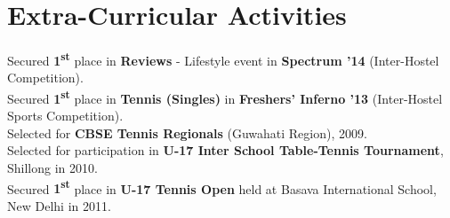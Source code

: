 \documentclass[a4paper]{norm-resume} %
\begin{document}
\vspace{2mm}	%


\section{Extra-Curricular Activities}

\vspace{2mm} %
	
	Secured \textbf{1\textsuperscript{st}} place in \textbf{Reviews} - Lifestyle event in \textbf{Spectrum '14} (Inter-Hostel Competition).\\
	Secured \textbf{1\textsuperscript{st}} place in \textbf{Tennis (Singles)} in \textbf{Freshers' Inferno '13} (Inter-Hostel Sports Competition).\\	
	Selected for \textbf{CBSE Tennis Regionals} (Guwahati Region), 2009.\\
	Selected for participation in \textbf{U-17 Inter School Table-Tennis Tournament}, Shillong in 2010.\\
	Secured \textbf{1\textsuperscript{st}} place in \textbf{U-17 Tennis Open} held at Basava International School, New Delhi in 2011.\\
\end{document}
